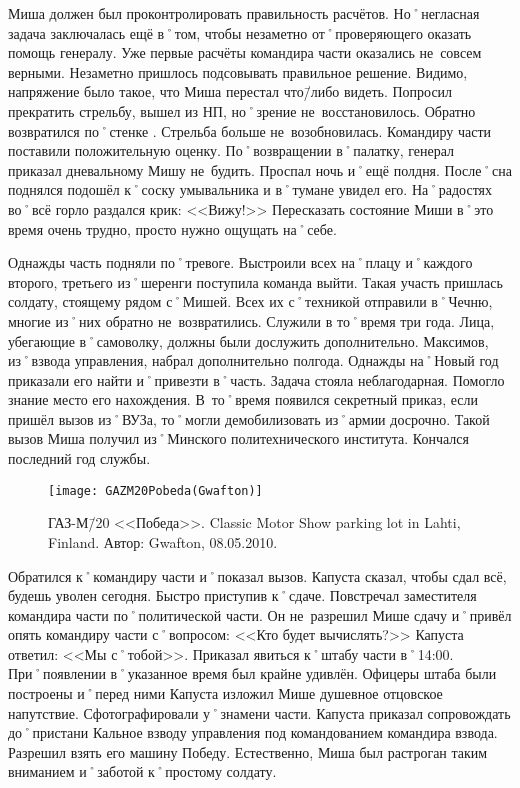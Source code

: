 Миша должен был проконтролировать правильность расчётов. Но˚негласная задача заключалась ещё в˚том, чтобы незаметно от˚проверяющего оказать помощь генералу. Уже первые расчёты командира части оказались не~совсем верными. Незаметно пришлось подсовывать правильное решение. Видимо, напряжение было такое, что Миша перестал что\=/либо видеть. Попросил прекратить стрельбу, вышел из НП, но˚зрение не~восстановилось. Обратно возвратился по˚стенке . Стрельба больше не~возобновилась. Командиру части поставили положительную оценку. По˚возвращении в˚палатку, генерал приказал дневальному Мишу не~будить. Проспал ночь и˚ещё полдня. После˚сна поднялся подошёл к˚соску умывальника и в˚тумане увидел его. На˚радостях во˚всё горло раздался крик: <<Вижу!>> Пересказать состояние Миши в˚это время очень трудно, просто нужно ощущать на˚себе.

Однажды часть подняли по˚тревоге. Выстроили всех на˚плацу и˚каждого второго, третьего из˚шеренги поступила команда выйти. Такая участь пришлась солдату, стоящему рядом с˚Мишей. Всех их с˚техникой отправили в˚Чечню, многие из˚них обратно не~возвратились. Служили в то˚время три года. Лица, убегающие в˚самоволку, должны были дослужить дополнительно. Максимов, из˚взвода управления, набрал дополнительно полгода. Однажды на˚Новый год приказали его найти и˚привезти в˚часть. Задача стояла неблагодарная. Помогло знание место его нахождения. В~то˚время появился секретный приказ, если пришёл вызов из˚ВУЗа, то˚могли демобилизовать из˚армии досрочно. Такой вызов Миша получил из˚Минского политехнического института. Кончался последний год службы.

\begin{wrapfigure}{O}{.4\textwidth}
\centering
\texttt{[image: GAZM20Pobeda(Gwafton)]}
\caption{ГАЗ-М\=/20 <<Победа>>. Classic Motor Show parking lot in Lahti, Finland. Автор: Gwafton, 08.05.2010.}
\label{fig:GAZM20Pobeda(Gwafton)}
\end{wrapfigure}

Обратился к˚командиру части и˚показал вызов. Капуста сказал, чтобы сдал всё, будешь уволен сегодня. Быстро приступив к˚сдаче. Повстречал заместителя командира части по˚политической части. Он не~разрешил Мише сдачу и˚привёл опять командиру части с˚вопросом: <<Кто будет вычислять?>> Капуста ответил: <<Мы с˚тобой>>. Приказал явиться к˚штабу части в˚14:00. При˚появлении в˚указанное время был крайне удивлён. Офицеры штаба были построены и˚перед ними Капуста изложил Мише душевное отцовское напутствие. Сфотографировали у˚знамени части. Капуста приказал сопровождать до˚пристани Кальное взводу управления под командованием командира взвода. Разрешил взять его машину Победу. Естественно, Миша был растроган таким вниманием и˚заботой к˚простому солдату. 

